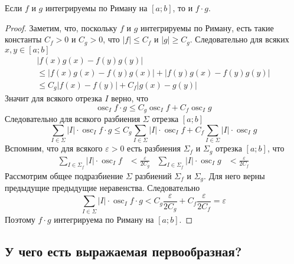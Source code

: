 \documentclass[12pt,a4paper]{article}
\DeclareMathOperator*{\osc}{osc}
\begin{document}
    \begin{lemma}
        Если $f$ и $g$ интегрируемы по Риману на $[a; b]$, то и $f \cdot g$.
    \end{lemma}

    \begin{proof}
        Заметим, что, поскольку $f$ и $g$ интегрируемы по Риману, есть такие константы $C_f > 0$ и $C_g > 0$, что $|f| \leqslant C_f$ и $|g| \geqslant C_g$. Следовательно для всяких $x, y \in [a; b]$
        \begin{multline*}
            |f(x)g(x) - f(y)g(y)|\\
            \leqslant |f(x)g(x) - f(y)g(x)| + |f(y)g(x) - f(y)g(y)|\\
            \leqslant C_g|f(x) - f(y)| + C_f|g(x) - g(y)|
        \end{multline*}
        Значит для всякого отрезка $I$ верно, что
        \[\osc_I f\cdot g \leqslant C_g \osc_I f + C_f \osc_I g\]
        Следовательно для всякого разбиения $\Sigma$ отрезка $[a; b]$
        \[\sum_{I \in \Sigma} |I| \cdot \osc_I f \cdot g \leqslant C_g \sum_{I \in \Sigma} |I| \cdot \osc_I f + C_f \sum_{I \in \Sigma} |I| \cdot \osc_I g\]
        Вспомним, что для всякого $\varepsilon > 0$ есть разбиения $\Sigma_f$ и $\Sigma_g$ отрезка $[a; b]$, что
        \begin{align*}
            \sum_{I \in \Sigma_f} |I| \cdot \osc_I f &< \frac{\varepsilon}{2C_g}&
            \sum_{I \in \Sigma_f} |I| \cdot \osc_I g &< \frac{\varepsilon}{2C_f}
        \end{align*}
        Рассмотрим общее подразбиение $\Sigma$ разбиений $\Sigma_f$ и $\Sigma_g$. Для него верны предыдущие предыдущие неравенства. Следовательно
        \[\sum_{I \in \Sigma} |I| \cdot \osc_I f \cdot g < C_g \frac{\varepsilon}{2C_g} + C_f \frac{\varepsilon}{2C_f} = \varepsilon\]
        Поэтому $f \cdot g$ интегрируема по Риману на $[a; b]$.
    \end{proof}

    \subsection{У чего есть выражаемая первообразная?}
\end{document}
